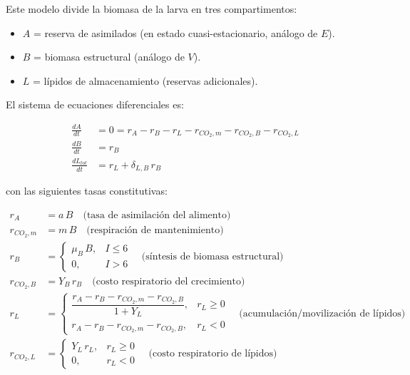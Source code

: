 \documentclass[11pt,a4paper]{article}
\begin{document}
Este modelo divide la biomasa de la larva en tres compartimentos:

\begin{itemize}
    \item $A$ = reserva de asimilados (en estado cuasi-estacionario, análogo de $E$).
    \item $B$ = biomasa estructural (análogo de $V$).
    \item $L$ = lípidos de almacenamiento (reservas adicionales).
\end{itemize}

El sistema de ecuaciones diferenciales es:

\begin{align}
    \frac{dA}{dt} &= 0 = r_A - r_B - r_L - r_{CO_2,m} - r_{CO_2,B} - r_{CO_2,L}
    \label{eq:plos_A} \\[6pt]
    \frac{dB}{dt} &= r_B
    \label{eq:plos_B} \\[6pt]
    \frac{dL_{tot}}{dt} &= r_L + \delta_{L,B}\,r_B
    \label{eq:plos_L}
\end{align}

con las siguientes tasas constitutivas:

\begin{align}
    r_A &= a\,B
    \quad\text{(tasa de asimilación del alimento)} \label{eq:plos_rA} \\[4pt]
    r_{CO_2,m} &= m\,B
    \quad\text{(respiración de mantenimiento)} \label{eq:plos_rCO2m} \\[4pt]
    r_B &=
    \begin{cases}
        \mu_B\,B, & I \le 6 \\[-2pt]
        0, & I > 6
    \end{cases}
    \quad\text{(síntesis de biomasa estructural)} \label{eq:plos_rB} \\[4pt]
    r_{CO_2,B} &= Y_B\,r_B
    \quad\text{(costo respiratorio del crecimiento)} \label{eq:plos_rCO2B} \\[4pt]
    r_L &=
    \begin{cases}
        \dfrac{r_A - r_B - r_{CO_2,m} - r_{CO_2,B}}{1+Y_L}, & r_L \ge 0 \\[8pt]
        r_A - r_B - r_{CO_2,m} - r_{CO_2,B}, & r_L < 0
    \end{cases}
    \quad\text{(acumulación/movilización de lípidos)} \label{eq:plos_rL} \\[4pt]
    r_{CO_2,L} &=
    \begin{cases}
        Y_L\,r_L, & r_L \ge 0 \\[-2pt]
        0, & r_L < 0
    \end{cases}
    \quad\text{(costo respiratorio de lípidos)} \label{eq:plos_rCO2L}
\end{align}
\end{document}

